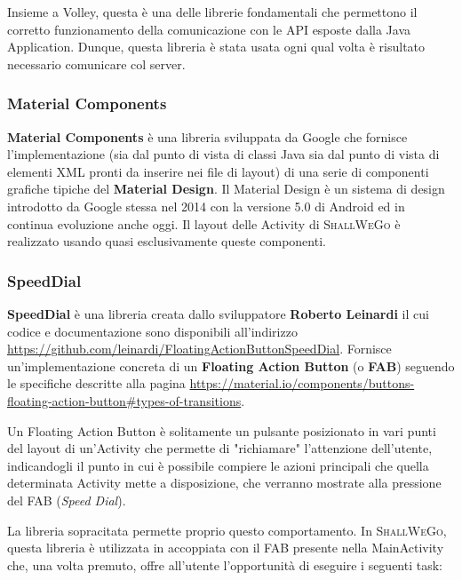                     Insieme a Volley, questa è una delle librerie fondamentali che permettono il corretto funzionamento della comunicazione con le API esposte dalla Java Application. Dunque, questa libreria è stata usata ogni qual volta è risultato necessario comunicare col server.

                \subsubsection{Material Components}
                    \textbf{Material Components} è una libreria sviluppata da Google che fornisce l'implementazione (sia dal punto di vista di classi Java sia dal punto di vista di elementi XML pronti da inserire nei file di layout) di una serie di componenti grafiche tipiche del \textbf{Material Design}. Il Material Design è un sistema di design introdotto da Google stessa nel 2014 con la versione 5.0 di Android ed in continua evoluzione anche oggi. Il layout delle Activity di \textsc{ShallWeGo} è realizzato usando quasi esclusivamente queste componenti.
                
                \subsubsection{SpeedDial}
                    \textbf{SpeedDial} è una libreria creata dallo sviluppatore \textbf{Roberto Leinardi} il cui codice e documentazione sono disponibili all'indirizzo \url{https://github.com/leinardi/FloatingActionButtonSpeedDial}. Fornisce un'implementazione concreta di un \textbf{Floating Action Button} (o \textbf{FAB}) seguendo le specifiche descritte alla pagina \url{https://material.io/components/buttons-floating-action-button#types-of-transitions}.
                    
                    Un Floating Action Button è solitamente un pulsante posizionato in vari punti del layout di un'Activity che permette di "richiamare" l'attenzione dell'utente, indicandogli il punto in cui è possibile compiere le azioni principali che quella determinata Activity mette a disposizione, che verranno mostrate alla pressione del FAB (\textit{Speed Dial}).
                    
                    La libreria sopracitata permette proprio questo comportamento. In \textsc{ShallWeGo}, questa libreria è utilizzata in accoppiata con il FAB presente nella MainActivity che, una volta premuto, offre all'utente l'opportunità di eseguire i seguenti task:

